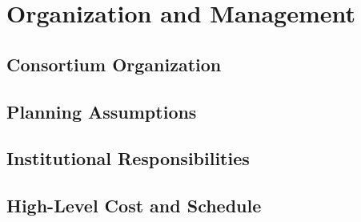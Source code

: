 \section{Organization and Management}
\label{sec:fdsp-tpcelec-management}

\subsection{Consortium Organization}
\label{sec:fdsp-tpcelec-management-consort}


\subsection{Planning Assumptions}
\label{sec:fdsp-tpcelec-management-planning}


\subsection{Institutional Responsibilities}
\label{sec:fdsp-tpcelec-management-resp}


\subsection{High-Level Cost and Schedule}
\label{sec:fdsp-tpcelec-management-cost}

